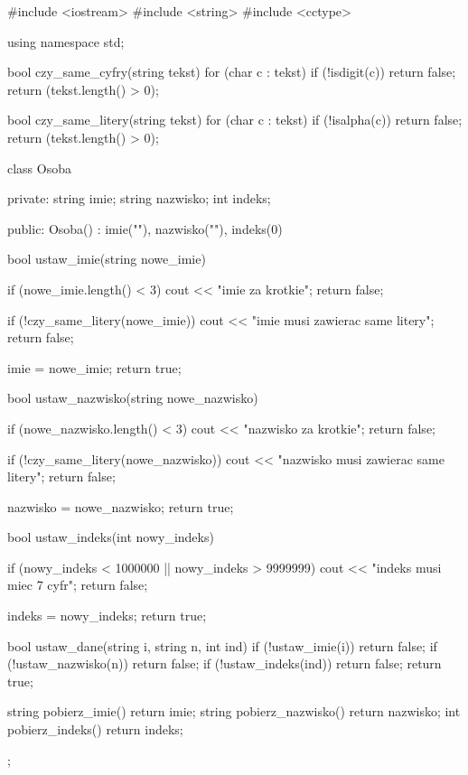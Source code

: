 #include <iostream>
#include <string>
#include <cctype>

using namespace std;


bool czy_same_cyfry(string tekst) {
    for (char c : tekst) if (!isdigit(c)) return false;
    return (tekst.length() > 0);
}

bool czy_same_litery(string tekst) {
    for (char c : tekst) if (!isalpha(c)) return false;
    return (tekst.length() > 0);
}


class Osoba {
private:
    string imie;
    string nazwisko;
    int indeks;

public:
    Osoba() : imie(""), nazwisko(""), indeks(0) {}

    bool ustaw_imie(string nowe_imie) {
        if (nowe_imie.length() < 3) {
            cout << "imie za krotkie\n";
            return false;
        }

        if (!czy_same_litery(nowe_imie)) {
            cout << "imie musi zawierac same litery\n";
            return false;
        }

        imie = nowe_imie;
        return true;
    }

    bool ustaw_nazwisko(string nowe_nazwisko) {
        if (nowe_nazwisko.length() < 3) {
            cout << "nazwisko za krotkie\n";
            return false;
        }

        if (!czy_same_litery(nowe_nazwisko)) {
            cout << "nazwisko musi zawierac same litery\n";
            return false;
        }

        nazwisko = nowe_nazwisko;
        return true;
    }

    bool ustaw_indeks(int nowy_indeks) {
        if (nowy_indeks < 1000000 || nowy_indeks > 9999999) {
            cout << "indeks musi miec 7 cyfr\n";
            return false;
        }

        indeks = nowy_indeks;
        return true;
    }

    bool ustaw_dane(string i, string n, int ind) {
        if (!ustaw_imie(i)) return false;
        if (!ustaw_nazwisko(n)) return false;
        if (!ustaw_indeks(ind)) return false;
        return true;
    }

    string pobierz_imie() { return imie; }
    string pobierz_nazwisko() { return nazwisko; }
    int pobierz_indeks() { return indeks; }
};


